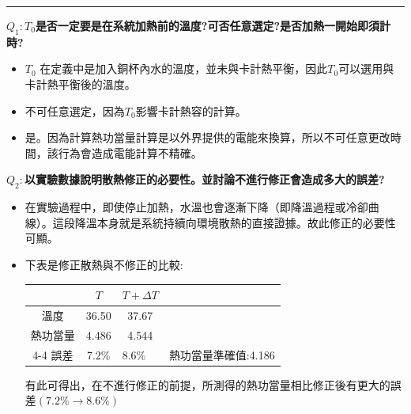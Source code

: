 \documentclass[12pt]{article}
\begin{document}
\hrule
\vspace*{0.5cm}
\noindent
\textbf{$Q_1:T_0$是否一定要是在系統加熱前的溫度?可否任意選定?是否加熱一開始即須計時?}
\begin{itemize}
    \item $T_0$ 在定義中是加入銅杯內水的溫度，並未與卡計熱平衡，因此$T_0$可以選用與卡計熱平衡後的溫度。
    \item 不可任意選定，因為$T_0$影響卡計熱容的計算。
    \item 是。因為計算熱功當量計算是以外界提供的電能來換算，所以不可任意更改時間，該行為會造成電能計算不精確。
\end{itemize}
\vspace*{0.5cm}
\noindent
\textbf{$Q_2:$以實驗數據說明散熱修正的必要性。並討論不進行修正會造成多大的誤差?\\}
\begin{itemize}
    \item 在實驗過程中，即使停止加熱，水溫也會逐漸下降（即降溫過程或冷卻曲線）。這段降溫本身就是系統持續向環境散熱的直接證據。故此修正的必要性可顯。
    \item 下表是修正散熱與不修正的比較:
    \begin{table}[H]
    \centering
    \begin{tabular}{cccc}
    \hline
         & $T$   & $T+\Delta T$               &                                    \\ \hline
    溫度   & 36.50 & 37.67                      &                                    \\ \hline
    熱功當量 & 4.486 & 4.544                      &                                    \\ \cline{4-4} 
    誤差   & 7.2\% & \multicolumn{1}{l|}{8.6\%} & \multicolumn{1}{l|}{熱功當量準確值:4.186} \\ \hline
    \end{tabular}
    \end{table}
    有此可得出，在不進行修正的前提，所測得的熱功當量相比修正後有更大的誤差$(7.2\% \rightarrow8.6\%) $
\end{itemize}
\end{document}

